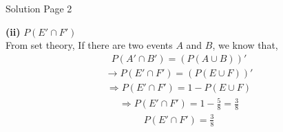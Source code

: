 \documentclass{beamer}
\begin{document}
\begin{frame}{Solution Page 2}

\textbf{(ii)} $P(E' \cap F')$\\
From set theory, If there are two events $A$ and $B$, we know that,
\begin{align}
    P(A' \cap B') = (P(A \cup B))'
\end{align}
\begin{align}
    \rightarrow P(E' \cap F') = (P(E \cup F))'
\end{align}
\begin{align}
    \Rightarrow P(E' \cap F') = 1 - P(E \cup F)
\end{align}
\begin{align}
    \Rightarrow P(E' \cap F') = 1 - \frac{5}{8} = \frac{3}{8}
\end{align}
\begin{align}
    \boxed{P(E' \cap F') = \frac{3}{8}}
\end{align}
    
\end{frame}
\end{document}
